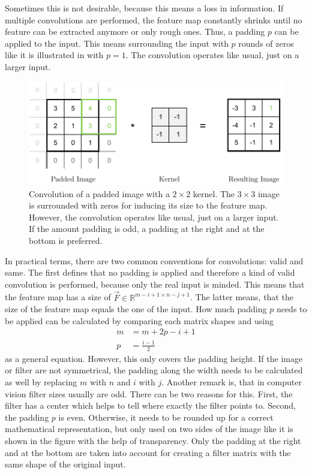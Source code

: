 Sometimes this is not desirable, because this means a loss in information.
If multiple convolutions are performed, the feature map constantly shrinks until no feature can be extracted anymore or only rough ones.
Thus, a padding $p$ can be applied to the input.
This means surrounding the input with $p$ rounds of zeros like it is illustrated in  with $p=1$.
The convolution operates like usual, just on a larger input.
\begin{figure}
	\centering
	\includegraphics{images/convolution_padding.pdf}
	\caption[Convolution of a Padded Image with a Kernel]{Convolution of a padded image with a $2 \times 2$ kernel. The $3 \times 3$ image is surrounded with zeros for inducing its size to the feature map. However, the convolution operates like usual, just on a larger input. If the amount padding is odd, a padding at the right and at the bottom is preferred.}
	\label{fig:convolution-padding}
\end{figure}
In practical terms, there are two common conventions for convolutions: valid and same.
The first defines that no padding is applied and therefore a kind of valid convolution is performed, because only the real input is minded.
This means that the feature map has a size of $\vec{F} \in \mathbb{R}^{m-i+1 \times n-j+1}$.
The latter means, that the size of the feature map equals the one of the input.
How much padding $p$ needs to be applied can be calculated by comparing each matrix shapes and using
\begin{align}
	m &= m+2p-i+1 \\
	p &= \frac{i-1}{2}
\end{align}
as a general equation.
However, this only covers the padding height.
If the image or filter are not symmetrical, the padding along the width needs to be calculated as well by replacing $m$ with $n$ and $i$ with $j$.
Another remark is, that in computer vision filter sizes usually are odd.
There can be two reasons for this.
First, the filter has a center which helps to tell where exactly the filter points to.
Second, the padding $p$ is even.
Otherwise, it needs to be rounded up for a correct mathematical representation, but only used on two sides of the image like it is shown in the figure with the help of transparency.
Only the padding at the right and at the bottom are taken into account for creating a filter matrix with the same shape of the original input.

